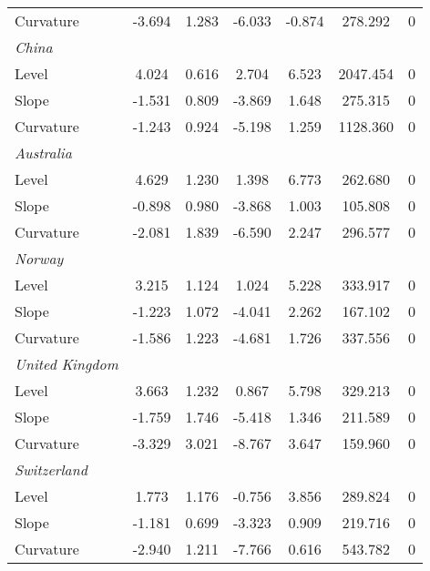\documentclass{article}
\begin{document}
\begin{table}[ht]
\begin{tabular}{l c c c c c c}
\medskip													
Curvature	&	-3.694	&	1.283	&	-6.033	&	-0.874	&	278.292	&	0	\\
\textit{China}	&		&		&		&		&		&		\\
Level	&	4.024	&	0.616	&	2.704	&	6.523	&	2047.454	&	0	\\
Slope	&	-1.531	&	0.809	&	-3.869	&	1.648	&	275.315	&	0	\\
\medskip													
Curvature	&	-1.243	&	0.924	&	-5.198	&	1.259	&	1128.360	&	0	\\
\textit{Australia}	&		&		&		&		&		&		\\
Level	&	4.629	&	1.230	&	1.398	&	6.773	&	262.680	&	0	\\
Slope	&	-0.898	&	0.980	&	-3.868	&	1.003	&	105.808	&	0	\\
\medskip													
Curvature	&	-2.081	&	1.839	&	-6.590	&	2.247	&	296.577	&	0	\\
\textit{Norway}	&		&		&		&		&		&		\\
Level	&	3.215	&	1.124	&	1.024	&	5.228	&	333.917	&	0	\\
Slope	&	-1.223	&	1.072	&	-4.041	&	2.262	&	167.102	&	0	\\
\medskip													
Curvature	&	-1.586	&	1.223	&	-4.681	&	1.726	&	337.556	&	0	\\
\textit{United Kingdom}	&		&		&		&		&		&		\\
Level	&	3.663	&	1.232	&	0.867	&	5.798	&	329.213	&	0	\\
Slope	&	-1.759	&	1.746	&	-5.418	&	1.346	&	211.589	&	0	\\
\medskip													
Curvature	&	-3.329	&	3.021	&	-8.767	&	3.647	&	159.960	&	0	\\
\textit{Switzerland}	&		&		&		&		&		&		\\
Level	&	1.773	&	1.176	&	-0.756	&	3.856	&	289.824	&	0	\\
Slope	&	-1.181	&	0.699	&	-3.323	&	0.909	&	219.716	&	0	\\
Curvature	&	-2.940	&	1.211	&	-7.766	&	0.616	&	543.782	&	0	\\

\hline%
\end{tabular}
\label{table:nonlin}%
\end{table}
\end{document}
